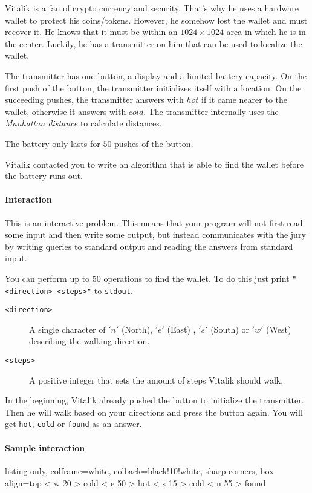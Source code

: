 




Vitalik is a fan of crypto currency and security.
That's why he uses a hardware wallet to protect his coins/tokens.
However, he somehow lost the wallet and must recover it.
He knows that it must be within an $1024 \times 1024$ area in which he is in the center.
Luckily, he has a transmitter on him that can be used to localize the wallet.

The transmitter has one button, a display and a limited battery capacity.
On the first push of the button, the transmitter initializes itself with a location.
On the succeeding pushes, the transmitter answers with $hot$ if it came nearer to the wallet,
otherwise it answers with  $cold$.
The transmitter internally uses the \textit{Manhattan distance} to calculate distances.

The battery only lasts for $50$ pushes of the button.

Vitalik contacted you to write an algorithm that is able to find the wallet before the battery runs out.

\paragraph*{Interaction}

This is an interactive problem. This means that your program will not first
read some input and then write some output, but instead communicates with
the jury by writing queries to standard output and reading the answers from
standard input.

You can perform up to $50$ operations to find the wallet. To do this just print
\texttt{"<direction> <steps>"} to \texttt{stdout}.

\begin{description}
    \item[\texttt{<direction>}] A single character of  $'n'$ (North), $'e'$ (East) , $'s'$ (South) or $'w'$ (West) describing the walking direction.
    \item[\texttt{<steps>}] A positive integer that sets the amount of steps Vitalik should walk.
\end{description}

In the beginning, Vitalik already pushed the button to initialize the transmitter.
Then he will walk based on your directions and press the button again.
You will get \texttt{hot}, \texttt{cold} or \texttt{found} as an answer.

\paragraph*{Sample interaction}

\noindent\begin{tcblisting}{listing only, colframe=white, colback=black!10!white, sharp corners, box align=top}
< w 20
> cold
< e 50
> hot
< s 15
> cold
< n 55
> found

\end{tcblisting}

